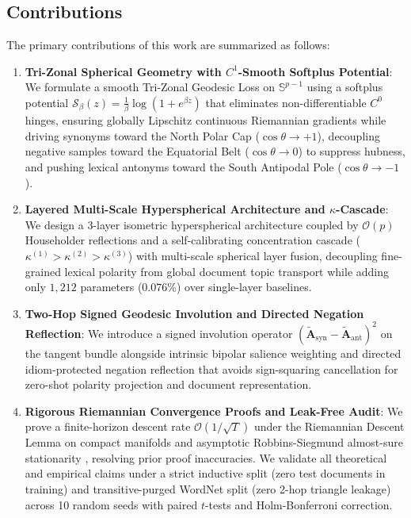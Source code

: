 \documentclass[journal]{IEEEtran}
\begin{document}
\subsection{Contributions}
The primary contributions of this work are summarized as follows:
\begin{enumerate}
    \item \textbf{Tri-Zonal Spherical Geometry with $C^1$-Smooth Softplus Potential}: We formulate a smooth Tri-Zonal Geodesic Loss on $\mathbb{S}^{p-1}$ using a softplus potential $\mathcal{S}_\beta(z) = \frac{1}{\beta}\log(1 + e^{\beta z})$ that eliminates non-differentiable $C^0$ hinges, ensuring globally Lipschitz continuous Riemannian gradients while driving synonyms toward the North Polar Cap ($\cos\theta \to +1$), decoupling negative samples toward the Equatorial Belt ($\cos\theta \to 0$) to suppress hubness, and pushing lexical antonyms toward the South Antipodal Pole ($\cos\theta \to -1$).
    \item \textbf{Layered Multi-Scale Hyperspherical Architecture and $\kappa$-Cascade}: We design a 3-layer isometric hyperspherical architecture coupled by $\mathcal{O}(p)$ Householder reflections and a self-calibrating concentration cascade ($\kappa^{(1)} > \kappa^{(2)} > \kappa^{(3)}$) with multi-scale spherical layer fusion, decoupling fine-grained lexical polarity from global document topic transport while adding only $1,212$ parameters ($0.076\%$) over single-layer baselines.
    \item \textbf{Two-Hop Signed Geodesic Involution and Directed Negation Reflection}: We introduce a signed involution operator $(\tilde{\mathbf{A}}_{\text{syn}} - \tilde{\mathbf{A}}_{\text{ant}})^2$ on the tangent bundle alongside intrinsic bipolar salience weighting and directed idiom-protected negation reflection that avoids sign-squaring cancellation for zero-shot polarity projection and document representation.
    \item \textbf{Rigorous Riemannian Convergence Proofs and Leak-Free Audit}: We prove a finite-horizon descent rate $\mathcal{O}(1/\sqrt{T})$ under the Riemannian Descent Lemma on compact manifolds and asymptotic Robbins-Siegmund almost-sure stationarity \cite{bonnabel2013stochastic}, resolving prior proof inaccuracies. We validate all theoretical and empirical claims under a strict inductive split (zero test documents in training) and transitive-purged WordNet split (zero 2-hop triangle leakage) across 10 random seeds with paired $t$-tests and Holm-Bonferroni correction.
\end{enumerate}
\end{document}
